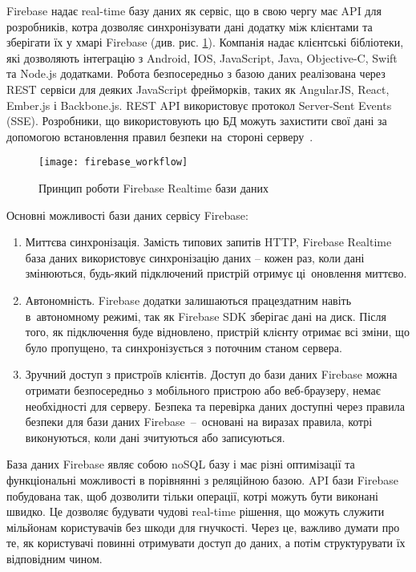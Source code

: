 \documentclass[../main.tex]{subfiles}
\begin{document}
Firebase надає real-time базу даних як сервіс, що в свою чергу має API для розробників, котра дозволяє синхронізувати дані додатку між клієнтами та зберігати їх у хмарі Firebase (див. рис. \ref{figure:firebase_workflow}). Компанія надає клієнтські бібліотеки, які дозволяють інтеграцію з Android, IOS, JavaScript, Java, Objective-C, Swift та Node.js додатками. Робота безпосередньо з базою даних реалізована через REST сервіси для деяких JavaScript фрейморків, таких як AngularJS, React, Ember.js і Backbone.js. REST API використовує протокол Server-Sent Events (SSE). Розробники, що використовують цю БД можуть захистити свої дані за допомогою встановлення правил безпеки на~стороні серверу~\cite{firebase_secure}.

\begin{figure}[H]
	\centering
	\texttt{[image: firebase\_workflow]}
	\caption{Принцип роботи Firebase Realtime бази даних}
	\label{figure:firebase_workflow}
\end{figure}

Основні можливості бази даних сервісу Firebase:
\begin{enumerate}
	\item Миттєва синхронізація. Замість типових запитів HTTP, Firebase Realtime база даних використовує синхронізацію даних -- кожен раз, коли дані змінюються, будь-який підключений пристрій отримує ці~оновлення миттєво.
	\item Автономність. Firebase додатки залишаються працездатним навіть в~автономному режимі, так як Firebase SDK зберігає дані на диск. Після того, як підключення буде відновлено, пристрій клієнту отримає всі зміни, що було пропущено, та синхронізується з поточним станом сервера.
	\item Зручний доступ з пристроїв клієнтів. Доступ до бази даних Firebase можна отримати безпосередньо з мобільного пристрою або веб-браузеру, немає необхідності для серверу. Безпека та перевірка даних доступні через правила безпеки для бази даних Firebase~--~основані на виразах правила, котрі виконуються, коли дані зчитуються або записуються.
\end{enumerate}

База даних Firebase являє собою noSQL базу і має різні оптимізації та функціональні можливості в порівнянні з реляційною базою. API бази Firebase побудована так, щоб дозволити тільки операції, котрі можуть бути виконані швидко. Це дозволяє будувати чудові real-time рішення, що можуть служити мільйонам користувачів без шкоди для гнучкості. Через це, важливо думати про те, як користувачі повинні отримувати доступ до даних, а потім структурувати їх відповідним чином.
\end{document}
